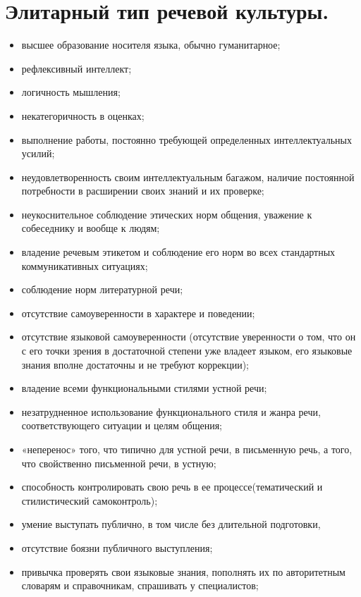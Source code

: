 \section{Элитарный тип речевой культуры.}

\begin{itemize}
    \item высшее образование носителя языка, обычно гуманитарное;
    \item рефлексивный интеллект;
    \item логичность мышления;
    \item некатегоричность в оценках;
    \item выполнение работы, постоянно требующей определенных интеллектуальных усилий;
    \item неудовлетворенность своим интеллектуальным багажом, наличие постоянной потребности в расширении своих знаний и их проверке;
    \item неукоснительное соблюдение этических норм общения, уважение к собеседнику и вообще к людям;
    \item владение речевым этикетом и соблюдение его норм во всех стандартных коммуникативных ситуациях;
    \item соблюдение норм литературной речи;
    \item отсутствие самоуверенности в характере и поведении;
    \item отсутствие языковой самоуверенности (отсутствие уверенности о том, что он с его точки зрения в достаточной степени уже владеет языком, его языковые знания вполне достаточны и не требуют коррекции);
    \item владение всеми функциональными стилями устной речи;
    \item незатрудненное использование функционального стиля и жанра речи, соответствующего ситуации и целям общения;
    \item «неперенос» того, что типично для устной речи, в письменную речь, а того, что свойственно письменной речи, в устную;
    \item способность контролировать свою речь в ее процессе(тематический и стилистический самоконтроль);
    \item умение выступать публично, в том числе без длительной подготовки,
    \item отсутствие боязни публичного выступления;
    \item привычка проверять свои языковые знания, пополнять их по авторитетным словарям и справочникам, спрашивать у специалистов;

\end{itemize}
